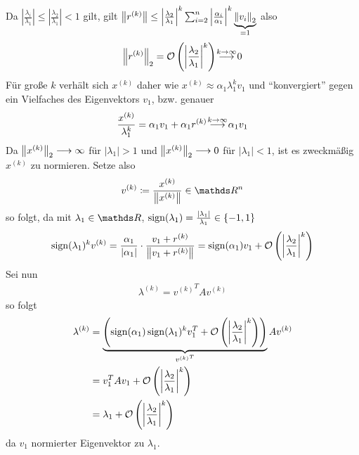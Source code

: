 Da $\left|\frac{\lambda_i}{\lambda_1}\right|
\leq \left|\frac{\lambda_2}{\lambda_1}\right|<1$
gilt, gilt 
  $\nn[r^{(k)}] \leq \left|\frac{\lambda_2}{\lambda_1}\right|^k
  \sum_{i=2}^n \left|\frac{\alpha_i}{\alpha_1}\right|^k
  \underbrace{\nn[v_i]_2}_{=1}$
also 
\begin{gather*}
  \nn[r^{(k)}]_2=\mathcal{O}\left(
    \left|\frac{\lambda_2}{\lambda_1}\right|^k 
  \right)
  \overset{\mathclap{k\to \infty}}{\longrightarrow} 0
\end{gather*}
Für große $k$ verhält sich $x^{(k)}$ daher wie 
$ x^{(k)}\approx \alpha_1\lambda_1^kv_1$
und \enquote{konvergiert} gegen ein Vielfaches des Eigenvektors $v_1$,
bzw. genauer
\begin{gather*}
  \frac{x^{(k)}}{\lambda_1^k}= \alpha_1v_1+\alpha_1r^{(k)}
  \overset{\mathclap{k\to \infty}}{\longrightarrow}
  \alpha_1v_1
\end{gather*}
Da $\nn[x^{(k)}]_2\longrightarrow\infty$ für $|\lambda_1|>1$
und $\nn[x^{(k)}]_2\longrightarrow 0$ für $|\lambda_1|<1$,
ist es zweckmäßig $x^{(k)}$ zu normieren.
Setze also
\begin{gather}
  v^{(k)} \coloneqq \frac{x^{(k)}}{ \nn[x^{(k)}] } \in \R^n
  \label{VIII.2.3}
\end{gather}
so folgt, da mit $\lambda_1\in \R$,
$\Sign(\lambda_1)=\frac{|\lambda_1|}{\lambda_1}\in\{-1,1\}$
\begin{gather}
  \Sign(\lambda_1)^k v^{(k)} = \frac{\alpha_1}{|\alpha_1|}
  \cdot \frac{v_1+r^{(k)}}{\nn[v_1+r^{(k)}]}
  = \Sign(\alpha_1)v_1 + \mathcal{O}\left(\left| 
      \frac{\lambda_2}{\lambda_1}
    \right|^k\right)
  \label{VIII.2.4}
\end{gather}
Sei nun
\begin{gather}
  \lambda^{(k)} = {v^{(k)}}^TAv^{(k)}
  \label{VIII.2.5}
\end{gather}
so folgt 
\begin{align*}
  \lambda^{(k)} &= \underbrace{ \left(
                  \Sign(\alpha_1)\Sign(\lambda_1)^kv_1^T
                  +\mathcal{O}\left( \left| \frac{\lambda_2}{\lambda_1} 
                  \right|^k \right)\right)
                  }_{
                  {v^{(k)}}^T
                  } Av^{(k)} \\
                &=v_1^T A v_1 + \mathcal{O}\left( \left|
                  \frac{\lambda_2}{\lambda_1} 
                  \right|^k \right) \\
                &= \lambda_1 + \mathcal{O}\left( 
                  \left| \frac{\lambda_2}{\lambda_1} 
                  \right|^k \right)
\end{align*}
da $v_1$ normierter Eigenvektor zu $\lambda_1$.

